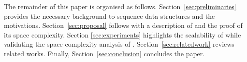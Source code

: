The remainder of this paper is organised as
follows. Section~\ref{sec:preliminaries} provides the necessary background to
sequence data structures and the motivations. Section~\ref{sec:proposal}
follows with a description of \LSEQ and the proof of its space
complexity. Section \ref {sec:experiments} highlights the scalability of
\CRATE while validating the space complexity analysis of
\LSEQ. Section~\ref{sec:relatedwork} reviews related works. Finally,
Section~\ref{sec:conclusion} concludes the paper.

